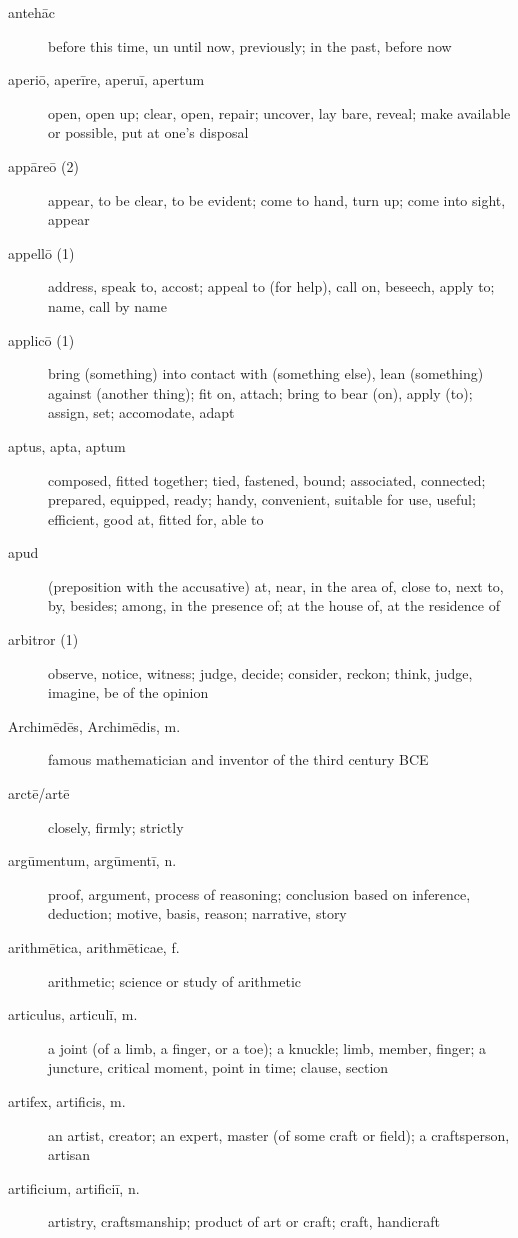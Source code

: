 \begin{description}
    \item[antehāc] before this time, un until now, previously; in the past, before now
    \item[aperiō, aperīre, aperuī, apertum] \marginnote{*}open, open up; clear, open, repair; uncover, lay bare, reveal; make available or possible, put at one's disposal
    \item[appāreō (2)] \marginnote{*}appear, to be clear, to be evident; come to hand, turn up; come into sight, appear
    \item[appellō (1)] \marginnote{*} address, speak to, accost; appeal to (for help), call on, beseech, apply to; name, call by name
    \item[applicō (1)] bring (something) into contact with (something else), lean (something) against (another thing); fit on, attach; bring to bear (on), apply (to); assign, set; accomodate, adapt
    \item[aptus, apta, aptum] \marginnote{*}composed, fitted together; tied, fastened, bound; associated, connected; prepared, equipped, ready; handy, convenient, suitable for use, useful; efficient, good at, fitted for, able to
    \item[apud] \marginnote{*}(preposition with the accusative) at, near, in the area of, close to, next to, by, besides; among, in the presence of; at the house of, at the residence of
    \item[arbitror (1)] \marginnote{*}observe, notice, witness; judge, decide; consider, reckon; think, judge, imagine, be of the opinion
    \item[Archimēdēs, Archimēdis, m.] famous mathematician and inventor of the third century BCE
    \item[arctē/artē] closely, firmly; strictly
    \item[argūmentum, argūmentī, n.] proof, argument, process of reasoning; conclusion based on inference, deduction; motive, basis, reason; narrative, story
    \item[arithmētica, arithmēticae, f.] arithmetic; science or study of arithmetic
    \item[articulus, articulī, m.] a joint (of a limb, a finger, or a toe); a knuckle; limb, member, finger; a juncture, critical moment, point in time; clause, section
    \item[artifex, artificis, m.] an artist, creator; an expert, master (of some craft or field); a craftsperson, artisan
    \item[artificium, artificiī, n.] artistry, craftsmanship; product of art or craft; craft, handicraft

\end{description}

